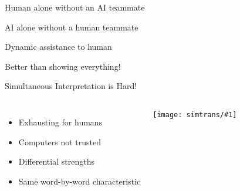 \documentclass[compress]{beamer}
\newcommand{\fsi}[2]{
\begin{frame}[plain]
\vspace*{-1pt}
\makebox[\linewidth]{\texttt{[image: \#1]}}
\begin{center}
#2
\end{center}
\end{frame}
}
\newcommand{\gfxs}[2]{
\begin{center}
	\texttt{[image: simtrans/\#1]}
\end{center}
}
\begin{document}
\fsi{qb/augment/bandit_result_none}{Human alone without an AI teammate}
\fsi{qb/augment/bandit_result_ai}{AI alone without a human teammate}
\fsi{qb/augment/bandit_result_dynamic}{Dynamic assistance to human}
\fsi{qb/augment/bandit_result}{Better than showing everything!}

\begin{frame}{Simultaneous Interpretation is Hard!}

  \begin{columns}
  \begin{itemize}
    \item Exhausting for humans
    \item Computers not trusted
    \item Differential strengths
    \item Same word-by-word characteristic
  \end{itemize}

 \gfxs{computer-interpreter}{1.0}
 \end{columns}
\end{frame}
\end{document}

